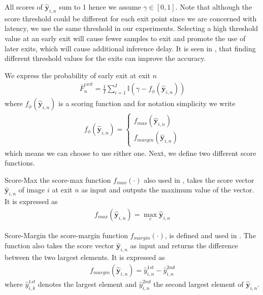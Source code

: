 \begin{enumdescript}
	All scores of  $ \bm{\hat{y}}_{i,n} $ sum to 1 hence we assume $	\gamma \in \left[0,1\right] $. Note that although the score threshold could be different for each exit point since we are concerned with latency, we use the same threshold in our experiments. Selecting a high threshold value at an early exit will cause fewer samples to exit and promote the use of later exits, which will cause additional inference delay. It is seen in \cite{teerapittayanon_finding_2018}, that finding different threshold values for the exits can improve the accuracy.
	
	We express the probability of early exit at exit $ n $		\begin{align}
	\overline{F}^{exit}_n = \frac{1}{I}\sum_{i=1}^{I} \mathbb{I} \left(\gamma-f_{\phi}\left(\bm{\hat{y}}_{i,n}\right) \right)
	\end{align}
	where $ f_\phi\left(\bm{\hat{y}}_{i,n}\right) $ is a scoring function and for notation simplicity we write 
	\begin{align}
	f_{\phi}\left(\bm{\hat{y}}_{i,n}\right) = \begin{cases}
	f_{max}\left(\bm{\hat{y}}_{i,n}\right)\\
	f_{margin}\left(\bm{\hat{y}}_{i,n}\right)
	\end{cases}
	\end{align}
	which means we can choose to use either one. Next, we define two different score functions.
	
	\begin{enumdescript}
		\item[Score-Max] the score-max function $ f_{max}(\cdot)$ also used in \cite{leroux_resource-constrained_2015}, takes the score vector $ \bm{\hat{y}}_{i,n} $ of image $ i $ at exit $ n $ as input and outputs the maximum value of the vector. It is expressed as
		\begin{align}
		f_{max}\left(\bm{\hat{y}}_{i,n}\right) = \underset{c}{\max} \bm{\hat{y}}_{i,n}
		\end{align}
		\item[Score-Margin] the score-margin function $ f_{margin}(\cdot)$, is defined and used in \cite{park_big/little_2015}. The function also takes the score vector $ \bm{\hat{y}}_{i,n} $ as input and returns the difference between the two largest elements. It is expressed as
		\begin{align}
		f_{margin}\left(\bm{\hat{y}}_{i,n}\right) = \hat{y}_{i,n}^{1st} - \hat{y}_{i,n}^{2nd} \label{eq:f_margin}
		\end{align}
		where $ \hat{y}_{i,k}^{1st} $ denotes the largest element and $ \hat{y}_{i,n}^{2nd} $ the second largest element of $ \bm{\hat{y}}_{i,n} $.
		

\end{enumdescript}
\end{enumdescript}
